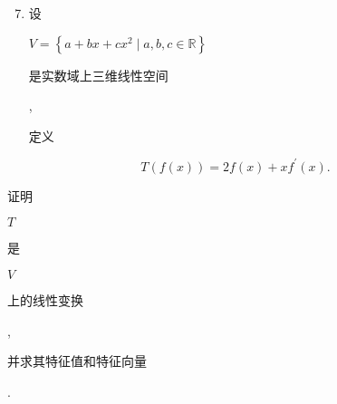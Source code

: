\documentclass[10pt]{article}
\begin{document}
\begin{enumerate}
  \setcounter{enumi}{6}
  \item \begin{CJK}{UTF8}{mj}设\end{CJK} $V=\left\{a+b x+c x^{2} \mid a, b, c \in \mathbb{R}\right\}$ \begin{CJK}{UTF8}{mj}是实数域上三维线性空间\end{CJK}, \begin{CJK}{UTF8}{mj}定义\end{CJK}
\end{enumerate}
$$
T(f(x))=2 f(x)+x f^{\prime}(x) .
$$
\begin{CJK}{UTF8}{mj}证明\end{CJK} $T$ \begin{CJK}{UTF8}{mj}是\end{CJK} $V$ \begin{CJK}{UTF8}{mj}上的线性变换\end{CJK}, \begin{CJK}{UTF8}{mj}并求其特征值和特征向量\end{CJK}.
\end{document}

